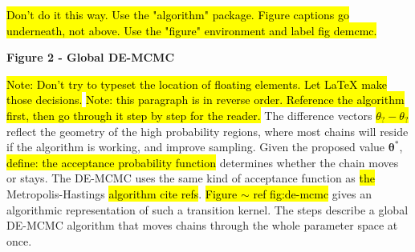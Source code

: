 \documentclass[12pt]{article}
\newcommand{\trish}[1]{\textrm{\hl{#1}}}
\begin{document}
%

\trish{Don't do it this way.  Use the "algorithm" package.  Figure
captions go underneath, not above.  Use the "figure" environment and
 label fig demcmc.}

\centerline{\textbf{Figure 2 - Global DE-MCMC}}


%

\trish{Note: Don't try to typeset the location of floating elements.
Let LaTeX make those decisions.}  \trish{Note: this paragraph is in
reverse order.  Reference the algorithm first, then go through it step
by step for the reader.}  The difference vectors \trish{$\theta_? -
\theta_?$} reflect the geometry of the high probability regions, where
most chains will reside if the algorithm is working, and improve
sampling. Given the proposed value $\boldsymbol{\theta}^*$,
\trish{define: the acceptance probability function} determines whether
the chain moves or stays. The DE-MCMC uses the same kind of acceptance
function as \trish{the} Metropolis-Hastings \trish{algorithm
cite refs}. \trish{Figure $\sim$ ref fig:de-mcmc} gives an algorithmic
representation of such a transition kernel. The steps describe a
global DE-MCMC algorithm that moves chains through the whole parameter
space at once.
\end{document}
